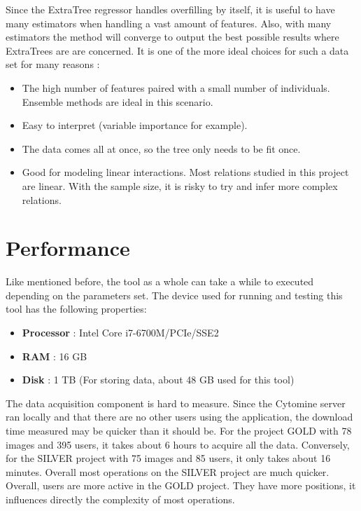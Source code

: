 \documentclass[a4paper,11pt]{report}
\numberwithin{figure}{section} %
\begin{document}
    Since the ExtraTree regressor handles overfilling by itself, it is useful to have many estimators when handling a vast amount of features.
    Also, with many estimators the method will converge to output the best possible results where ExtraTrees are are concerned.
    It is one of the more ideal choices for such a data set for many reasons :
    \begin{itemize}
        \item[\textbullet] The high number of features paired with a small number of individuals.
        Ensemble methods are ideal in this scenario.
        \item[\textbullet] Easy to interpret (variable importance for example).
        \item[\textbullet] The data comes all at once, so the tree only needs to be fit once.
        \item[\textbullet] Good for modeling linear interactions.
        Most relations studied in this project are linear.
        With the sample size, it is risky to try and infer more complex relations.
    \end{itemize}

    \section{Performance}

    Like mentioned before, the tool as a whole can take a while to executed depending on the parameters set.
    The device used for running and testing this tool has the following properties:
    \begin{itemize}
        \item[\textbullet] \textbf{Processor} : Intel Core i7-6700M/PCIe/SSE2
        \item[\textbullet] \textbf{RAM} : 16 GB
        \item[\textbullet] \textbf{Disk} : 1 TB (For storing data, about 48 GB used for this tool)
    \end{itemize}

    The data acquisition component is hard to measure.
    Since the Cytomine server ran locally and that there are no other users using the application, the download time measured may be quicker than it should be.
    For the project GOLD with 78 images and 395 users, it takes about 6 hours to acquire all the data.
    Conversely, for the SILVER project with 75 images and 85 users, it only takes about 16 minutes.
    Overall most operations on the SILVER project are much quicker.
    Overall, users are more active in the GOLD project.
    They have more positions, it influences directly the complexity of most operations.\\
\end{document}
